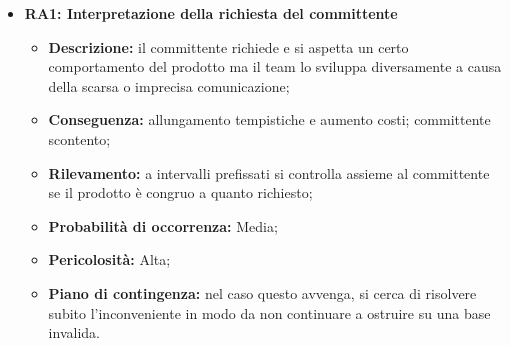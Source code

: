 \begin{itemize}
	\item \textbf{RA1: Interpretazione della richiesta del committente}
	\begin{itemize}
		\item \textbf{Descrizione:} il committente richiede e si aspetta un certo comportamento del prodotto ma il team lo sviluppa diversamente a causa della scarsa o imprecisa comunicazione;
		\item \textbf{Conseguenza:} allungamento tempistiche e aumento costi; committente scontento;
		\item \textbf{Rilevamento:} a intervalli prefissati si controlla assieme al committente se il prodotto è congruo a quanto richiesto;
		\item \textbf{Probabilità di occorrenza:} Media;
		\item \textbf{Pericolosità:} Alta;
		\item \textbf{Piano di contingenza:} nel caso questo avvenga, si cerca di risolvere subito l'inconveniente in modo da non continuare a ostruire su una base invalida.
	\end{itemize}
	
	
\end{itemize}